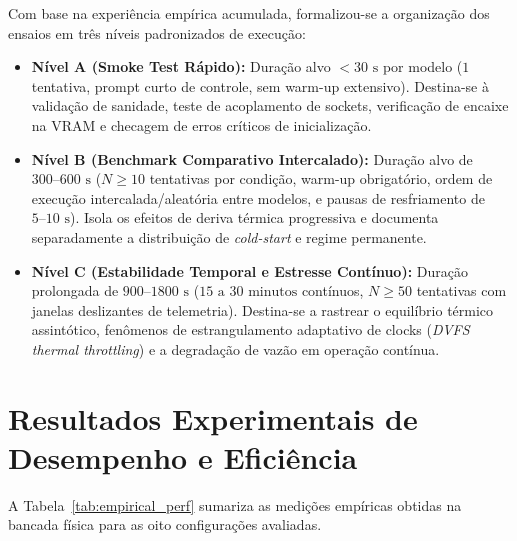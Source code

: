 \documentclass[10pt,a4paper,twocolumn]{article}
\begin{document}
Com base na experi\^encia emp\'irica acumulada, formalizou-se a organiza\c{c}\~ao dos ensaios em tr\^es n\'iveis padronizados de execu\c{c}\~ao:
\begin{itemize}[leftmargin=1.5em,itemsep=0.2em]
    \item \textbf{N\'ivel A (Smoke Test R\'apido):} Dura\c{c}\~ao alvo $< 30\text{ s}$ por modelo ($1$ tentativa, prompt curto de controle, sem warm-up extensivo). Destina-se \`a valida\c{c}\~ao de sanidade, teste de acoplamento de sockets, verifica\c{c}\~ao de encaixe na VRAM e checagem de erros cr\'iticos de inicializa\c{c}\~ao.
    \item \textbf{N\'ivel B (Benchmark Comparativo Intercalado):} Dura\c{c}\~ao alvo de $300\text{--}600\text{ s}$ ($N \ge 10$ tentativas por condi\c{c}\~ao, warm-up obrigat\'orio, ordem de execu\c{c}\~ao intercalada/aleat\'oria entre modelos, e pausas de resfriamento de $5\text{--}10\text{ s}$). Isola os efeitos de deriva t\'ermica progressiva e documenta separadamente a distribui\c{c}\~ao de \emph{cold-start} e regime permanente.
    \item \textbf{N\'ivel C (Estabilidade Temporal e Estresse Cont\'inuo):} Dura\c{c}\~ao prolongada de $900\text{--}1800\text{ s}$ ($15\text{ a }30\text{ minutos}$ cont\'inuos, $N \ge 50$ tentativas com janelas deslizantes de telemetria). Destina-se a rastrear o equil\'ibrio t\'ermico assint\'otico, fen\^omenos de estrangulamento adaptativo de clocks (\emph{DVFS thermal throttling}) e a degrada\c{c}\~ao de vaz\~ao em opera\c{c}\~ao cont\'inua.
\end{itemize}

\section{Resultados Experimentais de Desempenho e Efici\^encia}

A Tabela~\ref{tab:empirical_perf} sumariza as medi\c{c}\~oes emp\'iricas obtidas na bancada f\'isica para as oito configura\c{c}\~oes avaliadas.
\end{document}
